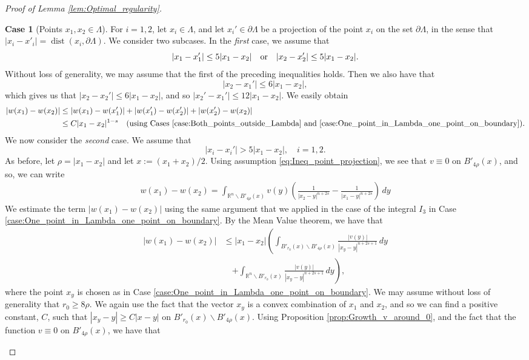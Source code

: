 \documentclass[11pt,reqno]{amsart}
\theoremstyle{definition}
\newtheorem{case}{Case}
\theoremstyle{remark}
\begin{document}
\begin{proof}[Proof of Lemma \ref{lem:Optimal_regularity}]
\begin{case}[Points $x_1,x_2\in\Lambda$]
\label{case:Both_points_in_Lambda}
For $i=1,2$, let $x_i\in \Lambda$, and let $x_i'\in\partial\Lambda$ be a projection of the point $x_i$ on the set $\partial\Lambda$, in the sense that $|x_i-x'_i|={\operatorname{dist}}(x_i,\partial\Lambda)$. We consider two subcases.
In the \emph{first} case, we assume that
$$
|x_1-x_1'| \leq 5 |x_1-x_2|\quad\hbox{or}\quad |x_2-x_2'| \leq 5 |x_1-x_2|.
$$ 
Without loss of generality, we may assume that the first of the preceding inequalities holds. Then we also have that
$$
|x_2-x_1'| \leq 6 |x_1-x_2|,
$$
which gives us that $|x_2-x_2'| \leq 6 |x_1-x_2|$, and so $|x_2'-x_1'| \leq 12 |x_1-x_2|$. We easily obtain
\begin{align*}
|w(x_1)-w(x_2)|&\leq |w(x_1)-w(x_1')|+|w(x_1')-w(x_2')|+|w(x_2')-w(x_2)| \\
&\leq C|x_1-x_2|^{1-s}\quad\hbox{(using Cases \ref{case:Both_points_outside_Lambda} and \ref{case:One_point_in_Lambda_one_point_on_boundary})}.
\end{align*}
We now consider the \emph{second} case. We assume that 
\begin{equation}
\label{eq:Ineq_point_projection}
|x_i-x_i'| > 5 |x_1-x_2|,\quad i=1,2.
\end{equation}
As before, let $\rho=|x_1-x_2|$ and let $x:=(x_1+x_2)/2$. Using assumption \eqref{eq:Ineq_point_projection}, we see that $v\equiv0$ on $B'_{4\rho}(x)$, and so, we can write
\begin{align*}
w(x_1)-w(x_2) = \int_{{\mathbb{R}}^n\backslash B'_{4\rho}(x)} v(y) \left(\frac{1}{|x_2-y|^{n+2s}}-\frac{1}{|x_1-y|^{n+2s}}\right)\, dy
\end{align*}
We estimate the term $|w(x_1)-w(x_2)|$ using the same argument that we applied in the case of the integral $I_3$ in Case \ref{case:One_point_in_Lambda_one_point_on_boundary}. By the Mean Value theorem, we have that
\begin{align*}
|w(x_1)-w(x_2)| &\leq |x_1-x_2|\left(\int_{B'_{r_0}(x)\backslash B'_{4\rho}(x)}  \frac{|v(y)|}{|x_y-y|^{n+2s+1}}\, dy\right.\\
&\quad\left.+\int_{{\mathbb{R}}^n\backslash B'_{r_0}(x)} \frac{|v(y)|}{|x_y-y|^{n+2s+1}}\, dy\right),
\end{align*}
where the point $x_y$ is chosen as in Case \ref{case:One_point_in_Lambda_one_point_on_boundary}. We may assume without loss of generality that $r_0\geq 8\rho$. We again use the fact that the vector $x_y$ is a convex combination of $x_1$ and $x_2$, and so we can find a positive constant, $C$, such that $|x_y-y|\geq C|x-y|$ on $B'_{r_0}(x)\backslash B'_{4\rho}(x)$. Using Proposition \ref{prop:Growth_v_around_0}, and the fact that the function $v\equiv 0$ on $B'_{4\rho}(x)$, we have that

\end{case}
\end{proof}
\end{document}
